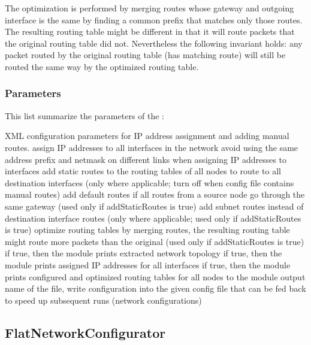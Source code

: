 The optimization is performed by merging routes whose gateway and
outgoing interface is the same by finding a common prefix that
matches only those routes. The resulting routing table might be
different in that it will route packets that the original routing table
did not. Nevertheless the following invariant holds: any packet routed
by the original routing table (has matching route) will still be routed
the same way by the optimized routing table.

\subsubsection*{Parameters}

This list summarize the parameters of the :

\begin{params}
   {XML configuration parameters for IP address assignment and adding manual routes.}
   {assign IP addresses to all interfaces in the network}
   {avoid using the same address prefix and
    netmask on different links when assigning IP addresses to interfaces}
   {add static routes to the routing tables of all nodes
    to route to all destination interfaces (only where applicable; turn off when
    config file contains manual routes)}
    {add default routes if all routes from a source node go
     through the same gateway (used only if addStaticRoutes is true)}
   {add subnet routes instead of destination interface routes
    (only where applicable; used only if addStaticRoutes is true)}
   {optimize routing tables by merging routes, the resulting routing table might
    route more packets than the original (used only if addStaticRoutes is true)}
   {if true, then the module prints extracted network topology}
   {if true, then the module prints assigned IP addresses for all interfaces}
   {if true, then the module prints configured and optimized routing tables for all nodes to
    the module output}
   {name of the file, write configuration into the given config file that can be fed back
    to speed up subsequent runs (network configurations)}
\end{params}

\subsection{FlatNetworkConfigurator}

